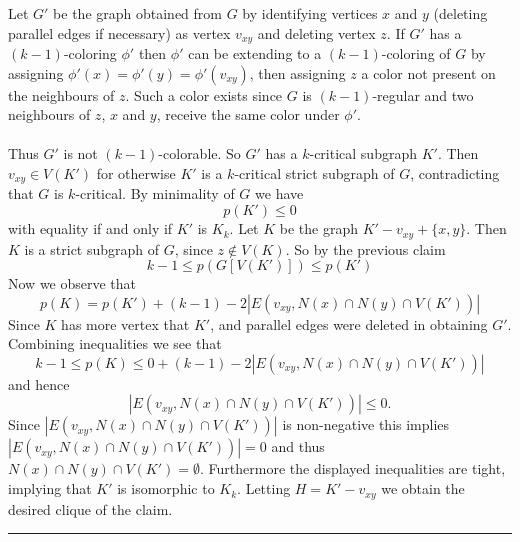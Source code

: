 \documentclass[letterpaper,12pt,oneside,onecolumn]{article}
\newenvironment{proof}{{\bf Proof:  }}{\hfill\rule{2mm}{2mm}}
\begin{document}
\begin{proof}
Let $G'$ be the graph obtained from $G$ by identifying vertices $x$ and $y$ (deleting parallel edges if necessary) as vertex $v_{xy}$ and deleting vertex $z$. If $G'$ has a $(k-1)$-coloring $\phi'$ then $\phi'$ can be extending to a $(k-1)$-coloring of $G$ by assigning $\phi'(x ) = \phi'(y) = \phi'(v_{xy})$, then assigning $z$ a color not present on the neighbours of $z$. Such a color exists since $G$ is $(k-1)$-regular and two neighbours of $z$, $x$ and $y$, receive the same color under $\phi'$.
\paragraph{}
Thus $G'$ is not $(k-1)$-colorable. So $G'$ has a $k$-critical subgraph $K'$. Then $v_{xy} \in V(K')$ for otherwise $K'$ is a $k$-critical strict subgraph of $G$, contradicting that $G$ is $k$-critical. By minimality of $G$ we have
$$p(K') \leq 0$$
with equality if and only if $K'$ is $K_k$. Let $K$ be the graph $K' - v_{xy} + \{x,y\}$. Then $K$ is a strict subgraph of $G$, since $z \not\in V(K)$. So by the previous claim
$$k-1 \leq p(G[V(K')]) \leq p(K')$$
Now we observe that
$$p(K) = p(K') + (k-1) - 2|E(v_{xy}, N(x) \cap N(y) \cap V(K'))|$$
Since $K$ has more vertex that $K'$, and parallel edges were deleted in obtaining $G'$. Combining inequalities we see that
$$k-1 \leq p(K) \leq 0 + (k-1) - 2|E(v_{xy}, N(x) \cap N(y) \cap V(K'))|$$
and hence 
$$|E(v_{xy}, N(x) \cap N(y) \cap V(K'))| \leq 0.$$
Since $|E(v_{xy}, N(x) \cap N(y) \cap V(K'))|$ is non-negative this implies $|E(v_{xy}, N(x) \cap N(y) \cap V(K'))| = 0$ and thus
$N(x)\cap N(y) \cap V(K') = \emptyset$. Furthermore the displayed inequalities are tight, implying that $K'$ is isomorphic to $K_k$. Letting $H = K'-v_{xy}$ we obtain the desired clique of the claim.
\end{proof}
\end{document}
